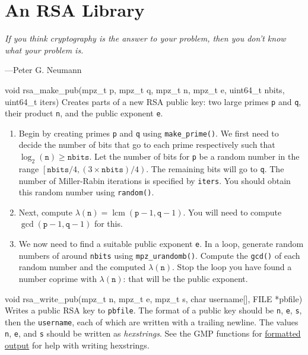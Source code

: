 \section{An RSA Library}
\epigraph{\emph{If you think cryptography is the answer to your problem, then you don't know what your problem is.}}{---Peter G.\xspace Neumann}

\noindent
\begin{funcdoc}{void rsa\_make\_pub(mpz\_t p, mpz\_t q, mpz\_t n, mpz\_t e,
uint64\_t nbits, uint64\_t iters)}
  Creates parts of a new RSA public key: two large primes \texttt{p} and
  \texttt{q}, their product \texttt{n}, and the public exponent
  \texttt{e}.

  \begin{enumerate}
    \item Begin by creating primes \texttt{p} and \texttt{q} using
      \texttt{make\_prime()}. We first need to decide the number of bits
      that go to each prime respectively such that $\log_2(\texttt{n})
      \ge \texttt{nbits}$. Let the number of bits for \texttt{p} be a
                  random number in the range
                  $\left [\texttt{nbits}/{4}, (3 \times \texttt{nbits})/{4} \right )$.
                  The remaining bits will go to
      \texttt{q}. The number of Miller-Rabin iterations is specified by
      \texttt{iters}. You should obtain this random number using
      \texttt{random()}.
    \item Next, compute $\lambda(\texttt{n}) = \operatorname{lcm}(\texttt{p} -
      1, \texttt{q} - 1)$. You will need to compute
      $\operatorname{gcd}(\texttt{p} - 1, \texttt{q} - 1)$ for this.
    \item We now need to find a suitable public exponent \texttt{e}. In a loop,
      generate random numbers of around \texttt{nbits} using
      \texttt{mpz\_urandomb()}. Compute the \texttt{gcd()} of each random number
      and the computed $\lambda(\texttt{n})$. Stop the loop you have found a
      number coprime with $\lambda(\texttt{n})$: that will be the public
      exponent.
  \end{enumerate}
\end{funcdoc}

\begin{funcdoc}{void rsa\_write\_pub(mpz\_t n, mpz\_t e, mpz\_t
s, char username[], FILE *pbfile)}
  Writes a public RSA key to \texttt{pbfile}. The format of a public key
  should be \texttt{n}, \texttt{e}, \texttt{s}, then the
  \texttt{username}, each of which are written with a trailing newline.
  The values \texttt{n}, \texttt{e}, and \texttt{s} should be written as
  \emph{hexstrings}. See the GMP functions for
  \href{https://gmplib.org/manual/Formatted-Output-Functions}{formatted
  output} for help with writing hexstrings.
\end{funcdoc}

